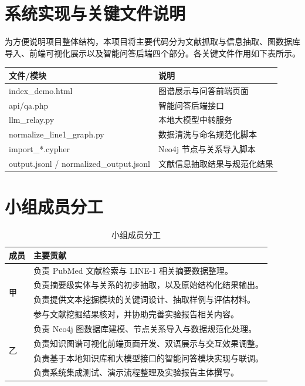 ﻿\section{系统实现与关键文件说明}

为方便说明项目整体结构，本项目将主要代码分为文献抓取与信息抽取、图数据库导入、前端可视化展示以及智能问答后端四个部分。各关键文件作用如下表所示。

\begin{longtable}{p{4cm} p{9cm}}
  \toprule
  文件/模块 & 说明 \\
  \midrule
  index\_demo.html & 图谱展示与问答前端页面 \\
  api/qa.php & 智能问答后端接口 \\
  llm\_relay.py & 本地大模型中转服务 \\
  normalize\_line1\_graph.py & 数据清洗与命名规范化脚本 \\
  import\_*.cypher & Neo4j 节点与关系导入脚本 \\
  output.jsonl / normalized\_output.jsonl & 文献信息抽取结果与规范化结果 \\
  \bottomrule
\end{longtable}

\section{小组成员分工}

\begin{table}[H]
  \centering
  \caption{小组成员分工}
  \renewcommand{\arraystretch}{1.35}
  \begin{tabular}{p{2.3cm} p{10.5cm}}
    \toprule
    成员 & 主要贡献 \\
    \midrule
    \multirow{4}{*}{甲}
      & 负责 PubMed 文献检索与 LINE-1 相关摘要数据整理。 \\
      & 负责摘要级实体与关系的初步抽取，以及原始结构化结果输出。 \\
      & 负责提供文本挖掘模块的关键词设计、抽取样例与评估材料。 \\
      & 参与文献挖掘结果核对，并协助完善实验报告相关内容。 \\
    \midrule
    \multirow{4}{*}{乙}
      & 负责 Neo4j 图数据库建模、节点关系导入与数据规范化处理。 \\
      & 负责知识图谱可视化前端页面开发、双语展示与交互效果调整。 \\
      & 负责基于本地知识库和大模型接口的智能问答模块实现与联调。 \\
      & 负责系统集成测试、演示流程整理及实验报告主体撰写。 \\
    \bottomrule
  \end{tabular}
\end{table}

